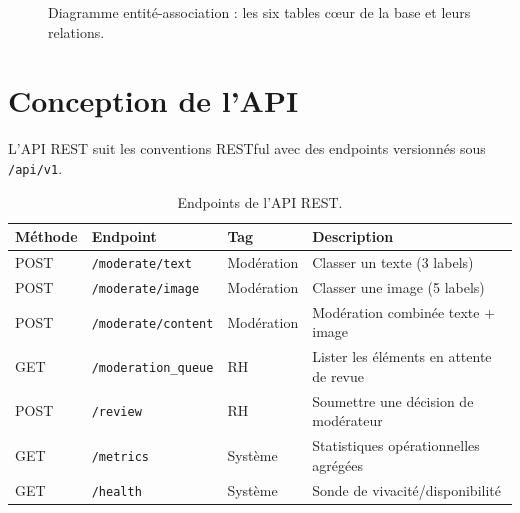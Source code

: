 \begin{figure}[H]
{}
\caption{Diagramme entité-association : les six tables cœur de la base et leurs relations.}
\label{fig:er_diagram}
\end{figure}

\section{Conception de l'API}

L'API REST suit les conventions RESTful avec des endpoints versionnés sous \texttt{/api/v1}.

\begin{table}[H]
\centering
\caption{Endpoints de l'API REST.}
\label{tab:api_endpoints}
\begin{tabularx}{\textwidth}{lllX}
\toprule
\textbf{Méthode} & \textbf{Endpoint} & \textbf{Tag} & \textbf{Description} \\
\midrule
POST & \texttt{/moderate/text} & Modération & Classer un texte (3 labels) \\
POST & \texttt{/moderate/image} & Modération & Classer une image (5 labels) \\
POST & \texttt{/moderate/content} & Modération & Modération combinée texte + image \\
GET & \texttt{/moderation\_queue} & RH & Lister les éléments en attente de revue \\
POST & \texttt{/review} & RH & Soumettre une décision de modérateur \\
GET & \texttt{/metrics} & Système & Statistiques opérationnelles agrégées \\
GET & \texttt{/health} & Système & Sonde de vivacité/disponibilité \\
\bottomrule
\end{tabularx}
\end{table}

